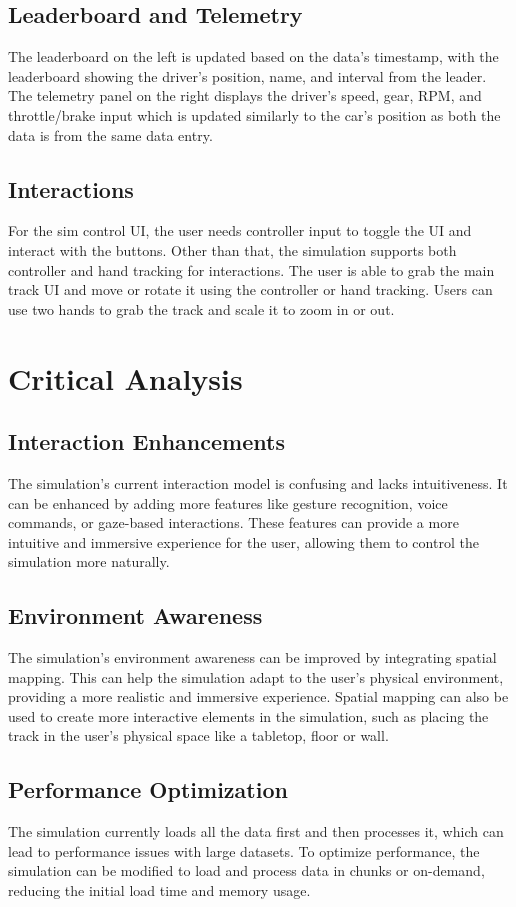\documentclass[
	a4paper, %
	10pt, %
	unnumberedsections, %
	twoside, %
]{LTJournalArticle}
\begin{document}
\subsection{Leaderboard and Telemetry}
The leaderboard on the left is updated based on the data's timestamp, with the leaderboard showing the driver's position, name, and interval from the leader. The telemetry panel on the right displays the driver's speed, gear, RPM, and throttle/brake input which is updated similarly to the car's position as both the data is from the same data entry.

\subsection{Interactions}
For the sim control UI, the user needs controller input to toggle the UI and interact with the buttons. Other than that, the simulation supports both controller and hand tracking for interactions. The user is able to grab the main track UI and move or rotate it using the controller or hand tracking. Users can use two hands to grab the track and scale it to zoom in or out.

\section{Critical Analysis}

\subsection{Interaction Enhancements}
The simulation's current interaction model is confusing and lacks intuitiveness. It can be enhanced by adding more features like gesture recognition, voice commands, or gaze-based interactions. These features can provide a more intuitive and immersive experience for the user, allowing them to control the simulation more naturally.

\subsection{Environment Awareness}
The simulation's environment awareness can be improved by integrating spatial mapping. This can help the simulation adapt to the user's physical environment, providing a more realistic and immersive experience. Spatial mapping can also be used to create more interactive elements in the simulation, such as placing the track in the user's physical space like a tabletop, floor or wall.
\subsection{Performance Optimization}
The simulation currently loads all the data first and then processes it, which can lead to performance issues with large datasets. To optimize performance, the simulation can be modified to load and process data in chunks or on-demand, reducing the initial load time and memory usage.
\end{document}
